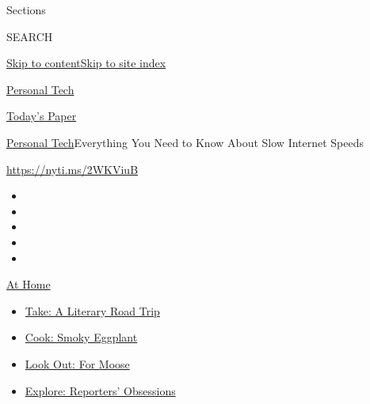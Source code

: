 Sections

SEARCH

\protect\hyperlink{site-content}{Skip to
content}\protect\hyperlink{site-index}{Skip to site index}

\href{https://www.nytimes3xbfgragh.onion/section/technology/personaltech}{Personal
Tech}

\href{https://myaccount.nytimes3xbfgragh.onion/auth/login?response_type=cookie\&client_id=vi}{}

\href{https://www.nytimes3xbfgragh.onion/section/todayspaper}{Today's
Paper}

\href{/section/technology/personaltech}{Personal
Tech}\textbar{}Everything You Need to Know About Slow Internet Speeds

\url{https://nyti.ms/2WKViuB}

\begin{itemize}
\item
\item
\item
\item
\item
\end{itemize}

\href{https://www.nytimes3xbfgragh.onion/spotlight/at-home?action=click\&pgtype=Article\&state=default\&region=TOP_BANNER\&context=at_home_menu}{At
Home}

\begin{itemize}
\tightlist
\item
  \href{https://www.nytimes3xbfgragh.onion/2020/07/28/books/time-for-a-literary-road-trip.html?action=click\&pgtype=Article\&state=default\&region=TOP_BANNER\&context=at_home_menu}{Take:
  A Literary Road Trip}
\item
  \href{https://www.nytimes3xbfgragh.onion/2020/07/29/magazine/bored-with-your-home-cooking-some-smoky-eggplant-will-fix-that.html?action=click\&pgtype=Article\&state=default\&region=TOP_BANNER\&context=at_home_menu}{Cook:
  Smoky Eggplant}
\item
  \href{https://www.nytimes3xbfgragh.onion/2020/07/27/travel/moose-michigan-isle-royale.html?action=click\&pgtype=Article\&state=default\&region=TOP_BANNER\&context=at_home_menu}{Look
  Out: For Moose}
\item
  \href{https://www.nytimes3xbfgragh.onion/interactive/2020/at-home/even-more-reporters-editors-diaries-lists-recommendations.html?action=click\&pgtype=Article\&state=default\&region=TOP_BANNER\&context=at_home_menu}{Explore:
  Reporters' Obsessions}
\end{itemize}

